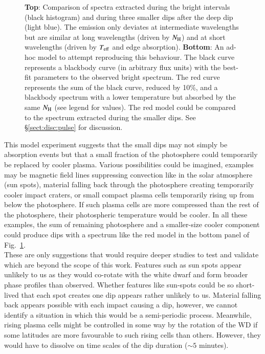 \documentclass{aa}
\begin{document}
\begin{figure}[!ht]

\caption{\label{fig:cmpdips}{\bf Top}: Comparison of spectra
extracted during the bright intervals (black histogram)
and during three smaller dips after the deep dip
(light blue). The emission only deviates at intermediate wavelengths
but are similar at long wavelengths (driven by $N_{\rm H}$) and at
short wavelengths (driven by $T_{\rm eff}$ and edge absorption).
{\bf Bottom}: An ad-hoc model to attempt reproducing this behaviour.
The black curve represents a blackbody curve (in arbitrary
flux units) with the
best-fit parameters to the observed bright spectrum. The red
curve represents the sum of the black curve, reduced by 10\%, and
a blackbody spectrum with a lower temperature but absorbed by the
same $N_{\rm H}$ (see legend for values).
The red model could be compared to the spectrum extracted during
the smaller dips.
See \S\ref{sect:disc:pulse} for discussion.
}
\end{figure}

This model experiment suggests that the small dips may not simply be
absorption events but that a small fraction of the photosphere could
temporarily be replaced by cooler plasma.
Various possibilities could be imagined, examples may be magnetic
field lines suppressing convection like in the solar atmosphere
(sun spots),
material falling back through the photosphere creating temporarily
cooler impact craters, or small compact plasma cells temporarily
rising up from below the photosphere. If such plasma cells
are more compressed than the rest of the photosphere,
their photospheric temperature would be cooler.
In all these examples, the sum of remaining photosphere and a
smaller-size cooler component could produce dips with a spectrum
like the red model in the bottom panel of Fig.~\ref{fig:cmpdips}.\\

These are only suggestions that would require deeper studies to test
and validate which are beyond the scope of this work. Features such as
sun spots appear unlikely to us as they would co-rotate with the white
dwarf and form broader phase profiles than observed. Whether features
like sun-spots could be so short-lived that each spot creates one dip
appears rather unlikely to us. Material falling back appears possible
with each impact causing a dip, however, we cannot identify a situation
in which this would be a semi-periodic process. Meanwhile, rising plasma
cells might be controlled in some way by the rotation of the WD if some
latitudes are more favourable to such rising cells than others. However,
they would have to dissolve on time scales of the dip duration ($\sim 5$
minutes).\\
\end{document}
